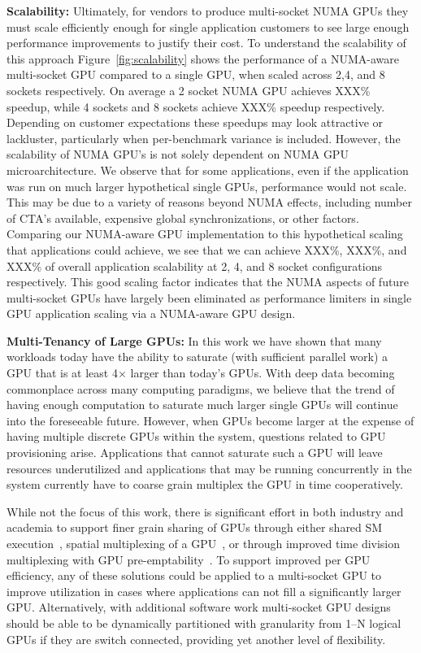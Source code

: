 \textbf{Scalability:} Ultimately, for vendors to produce multi-socket NUMA 
GPUs they must scale efficiently enough for single application customers to 
see large enough performance improvements to justify their cost.  To 
understand the scalability of this approach Figure~\ref{fig:scalability} 
shows the performance of a NUMA-aware multi-socket GPU compared to a single 
GPU, when scaled across 2,4, and 8 sockets respectively.  On average a 2 
socket NUMA GPU achieves XXX\% speedup, while 4 sockets and 8 sockets achieve 
XXX\% speedup respectively.  Depending on customer expectations these 
speedups may look attractive or lackluster, particularly when per-benchmark 
variance is included.  However, the scalability of NUMA GPU's is not solely 
dependent on NUMA GPU microarchitecture. We observe that for some 
applications, even if the application was run on much larger hypothetical 
single GPUs, performance would not scale.  This may be due to a variety of 
reasons beyond NUMA effects, including number of CTA's available, expensive 
global synchronizations, or other factors.  Comparing our NUMA-aware GPU 
implementation to this hypothetical scaling that applications could achieve, 
we see that we can achieve XXX\%, XXX\%, and XXX\% of overall application 
scalability at 2, 4, and 8 socket configurations respectively.  This good 
scaling factor indicates that the NUMA aspects of future multi-socket GPUs 
have largely been eliminated as performance limiters in single GPU 
application scaling via a NUMA-aware GPU design.

\textbf{Multi-Tenancy of Large GPUs:} In this work we have shown that many 
workloads today have the ability to saturate (with sufficient parallel work) 
a GPU that is at least 4$\times$ larger than today's GPUs.  With deep data 
becoming commonplace across many computing paradigms, we believe that the 
trend of having enough computation to saturate much larger single GPUs will 
continue into the foreseeable future. However, when GPUs become larger at the 
expense of having multiple discrete GPUs within the system, questions related 
to GPU provisioning arise.  Applications that cannot saturate such a GPU will 
leave resources underutilized and applications that may be running 
concurrently in the system currently have to coarse grain multiplex the GPU 
in time cooperatively. 

While not the focus of this work, there is significant effort in both 
industry and academia to support finer grain sharing of GPUs through either 
shared SM execution~\cite{tanasic2014enabling}, spatial multiplexing of a 
GPU~\cite{park2015chimera}, or through improved time division multiplexing 
with GPU pre-emptability~\cite{lin2016enabling}.  To support improved per GPU 
efficiency, any of these solutions could be applied to a multi-socket GPU to 
improve utilization in cases where applications can not fill a significantly 
larger GPU.  Alternatively, with additional software work multi-socket GPU 
designs should be able to be dynamically partitioned with granularity from 
1--N logical GPUs if they are switch connected, providing yet another level 
of flexibility.

